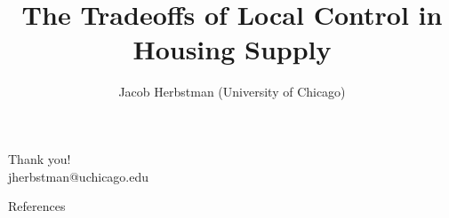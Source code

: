 \documentclass[11pt,notes=hide,aspectratio=169,mathserif]{beamer}
\title[Local Control]{The Tradeoffs of Local Control in Housing Supply}
\author[Jacob Herbstman]{Jacob Herbstman (University of Chicago)}
\date{\monthname[\the\month] \the\year}
\begin{document}
\begin{frame}[plain]
\titlepage
\note{
    \begin{itemize}
    \end{itemize}
}
\end{frame}









%

%

%

%

\begin{frame}[plain]
    \begin{center}
      {\LARGE Thank you!}\\[0.4em]
      {\large {jherbstman@uchicago.edu}}
    \end{center}
\end{frame}

\appendix

\begin{frame}[allowframebreaks]{References}
    \tiny
    
    
\end{frame}
\end{document}
